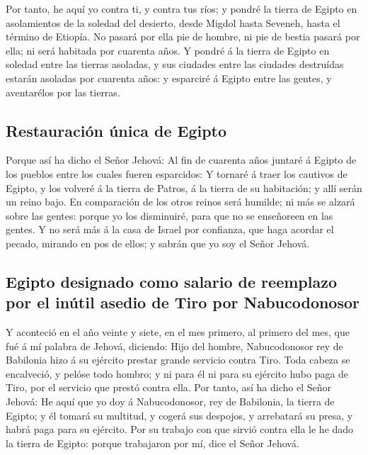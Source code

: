  Por tanto, he aquí yo contra ti, y contra tus ríos; y
pondré la tierra de Egipto en asolamientos de la soledad del desierto,
desde Migdol hasta Seveneh, hasta el término de Etiopía. 
No pasará por ella pie de hombre, ni pie de bestia pasará por ella; ni
será habitada por cuarenta años.  Y pondré á la tierra de
Egipto en soledad entre las tierras asoladas, y sus ciudades entre las
ciudades destruídas estarán asoladas por cuarenta años: y esparciré á
Egipto entre las gentes, y aventarélos por las tierras.

\hypertarget{restauraciuxf3n-uxfanica-de-egipto}{%
\subsection{Restauración única de
Egipto}\label{restauraciuxf3n-uxfanica-de-egipto}}

 Porque así ha dicho el Señor Jehová: Al fin de cuarenta
años juntaré á Egipto de los pueblos entre los cuales fueren esparcidos:
 Y tornaré á traer los cautivos de Egipto, y los volveré
á la tierra de Patros, á la tierra de su habitación; y allí serán un
reino bajo.  En comparación de los otros reinos será
humilde; ni más se alzará sobre las gentes: porque yo los disminuiré,
para que no se enseñoreen en las gentes.  Y no será más á
la casa de Israel por confianza, que haga acordar el pecado, mirando en
pos de ellos; y sabrán que yo soy el Señor Jehová.

\hypertarget{egipto-designado-como-salario-de-reemplazo-por-el-inuxfatil-asedio-de-tiro-por-nabucodonosor}{%
\subsection{Egipto designado como salario de reemplazo por el inútil
asedio de Tiro por
Nabucodonosor}\label{egipto-designado-como-salario-de-reemplazo-por-el-inuxfatil-asedio-de-tiro-por-nabucodonosor}}

 Y aconteció en el año veinte y siete, en el mes primero,
al primero del mes, que fué á mí palabra de Jehová, diciendo:
 Hijo del hombre, Nabucodonosor rey de Babilonia hizo á
su ejército prestar grande servicio contra Tiro. Toda cabeza se
encalveció, y pelóse todo hombro; y ni para él ni para su ejército hubo
paga de Tiro, por el servicio que prestó contra ella. 
Por tanto, así ha dicho el Señor Jehová: He aquí que yo doy á
Nabucodonosor, rey de Babilonia, la tierra de Egipto; y él tomará su
multitud, y cogerá sus despojos, y arrebatará su presa, y habrá paga
para su ejército.  Por su trabajo con que sirvió contra
ella le he dado la tierra de Egipto: porque trabajaron por mí, dice el
Señor Jehová.

